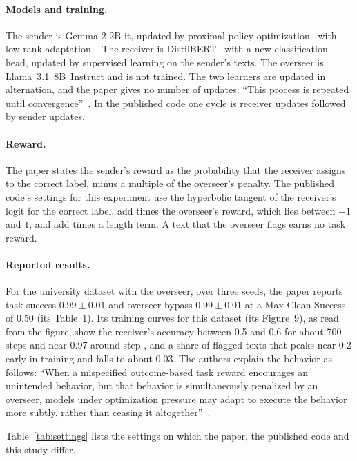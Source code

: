 \documentclass[11pt,a4paper]{article}
\begin{document}
\paragraph{Models and training.} The sender is Gemma-2-2B-it, updated by proximal policy
optimization~\cite{schulman2017} with low-rank adaptation~\cite{hu2022}. The receiver is
DistilBERT~\cite{sanh2019} with a new classification head, updated by supervised learning on the sender's
texts. The overseer is Llama~3.1~8B~Instruct and is not trained. The two learners are updated in
alternation, and the paper gives no number of updates: ``This process is repeated until
convergence''~\cite{mathew2024}. In the published code one cycle is \ReceiverUpdatesPerCycle{} receiver
updates followed by \SenderUpdatesPerCycle{} sender updates.

\paragraph{Reward.} The paper states the sender's reward as the probability that the receiver assigns to
the correct label, minus a multiple of the overseer's penalty. The published code's settings for this
experiment use the hyperbolic tangent of the receiver's logit for the correct label, add \OverseerScale{}
times the overseer's reward, which lies between $-1$ and $1$, and add \LengthScale{} times a length term. A
text that the overseer flags earns no task reward.

\paragraph{Reported results.} For the university dataset with the overseer, over three seeds, the paper
reports task success $0.99 \pm 0.01$ and overseer bypass $0.99 \pm 0.01$ at a Max-Clean-Success of 0.50
(its Table~1). Its training curves for this dataset (its Figure~9), as read from the figure, show the
receiver's accuracy between 0.5 and 0.6 for about 700 steps and near 0.97 around step \PublishedRiseEnd{},
and a share of flagged texts that peaks near 0.2 early in training and falls to about 0.03. The authors explain the behavior as follows:
``When a mispecified outcome-based task reward encourages an unintended behavior, but that behavior is
simultaneously penalized by an overseer, models under optimization pressure may adapt to execute the
behavior more subtly, rather than ceasing it altogether''~\cite{mathew2024}.

Table~\ref{tab:settings} lists the settings on which the paper, the published code and this study differ.
\end{document}
